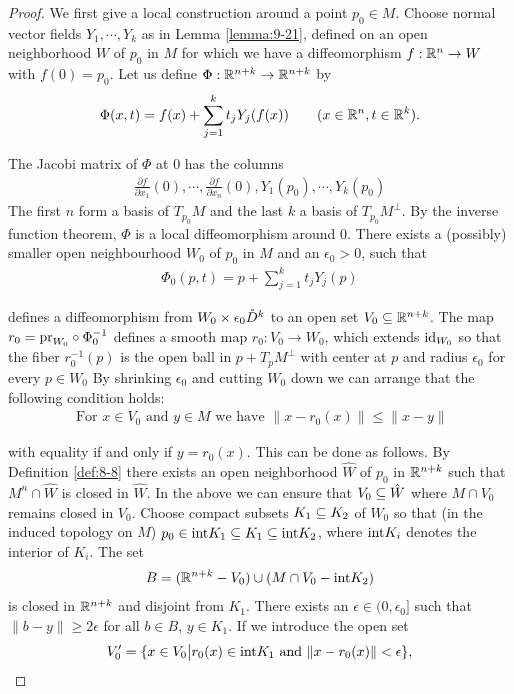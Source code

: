 \begin{proof}
  We first give a local construction around a point $p_0\in M$. Choose normal
vector fields $Y_1, \cdots,Y_k$ as in Lemma \ref{lemma:9-21}, defined on an open neighborhood $W$
of $p_0$ in $M$ for which we have a diffeomorphism $f:\mathbb{R}^n\to W$ with $f(0)= p_0$.
Let us define $\Phi:\mathbb{R}^{n+k}\to\mathbb{R}^{n+k}$ by
\begin{align*}
  \Phi(x, t) = f(x) + \sum_{j=1}^{k}{t_jY_j(f(x))}\qquad (x\in\mathbb{R}^n, t\in \mathbb{R}^k). 
\end{align*}

The Jacobi matrix of $\Phi$ at 0 has the columns
\begin{align*}
  \frac{\partial f }{\partial x_1}(0), \cdots, 
  \frac{\partial f }{\partial x_n }(0),
  Y_1(p_0), \cdots, Y_k(p_0)
\end{align*}
The first $n$ form a basis of $T_{p_0}M$ and the last $k$ a basis of $T_{p_0}M^\perp$. By the inverse
function theorem, $\Phi$ is a local diffeomorphism around 0. There exists a (possibly)
smaller open neighbourhood $W_0$ of $p_0$ in $M$ and an $\epsilon_0>0$, such that
\begin{align*}
  \Phi_0(p, t) = p + \sum_{j=1}^{k}{t_jY_j(p)}
\end{align*}

defines a diffeomorphism from $W_0\times \epsilon_0\mathring{D}^k$ to an open set $V_0\subseteq \mathbb{R}^{n+k}$. 
The map $r_0 = \mathrm{pr}_{W_0}\circ \Phi_0^{-1}$ defines a smooth map $r_0:V_0\to W_0$, which extends 
$\operatorname{id}_{W_0}$ so that the fiber $r_0^{-1}(p)$ is the open ball in $p+T_pM^\perp$ with center at $p$ 
and radius $\epsilon_0$ for every $p\in W_0$ By shrinking $\epsilon_0$ and cutting $W_0$ down we can 
arrange that the following condition holds:
\begin{align}\label{eq:9-20}
  \text{ For } x\in V_0 \text{ and } y\in M \text{ we have } \|x-r_0(x)\|\le \|x-y\|
\end{align}

with equality if and only if $y = r_0(x)$. This can be done as follows.
By Definition \ref{def:8-8} there exists an open neighborhood $\hat{W}$ of $p_0$ 
in $\mathbb{R}^{n+k}$ such that $M^n\cap\hat{W}$ is closed in $\hat{W}$. In the above we can 
ensure that $V_0\subseteq \hat{W}$ where $M\cap V_0$ remains closed in $V_0$. Choose compact 
subsets $K_1\subseteq K_2$ of $W_0$ so that (in the induced topology on $M$) $p_0\in\mathrm{int}K_1\subseteq K_1\subseteq\mathrm{int}K_2$,
where $\mathrm{int}K_i$ denotes the interior of $K_i$. The set
\begin{align*}
  B = (\mathbb{R}^{n+k}-V_0)\cup (M\cap V_0 - \mathrm{int}K_2)
\end{align*}
is closed in $\mathbb{R}^{n+k}$ and disjoint from $K_1$. There exists an $\epsilon\in(0, \epsilon_0]$ such 
that $\|b-y\|\ge 2\epsilon$ for all $b\in B$, $y\in K_1$. If we introduce the open set
\begin{align*}
  V_0' = \{x\in V_0\big| r_0(x)\in\mathrm{int}K_1 \text{ and } \|x-r_0(x)\|<\epsilon\},
\end{align*}


\end{proof}

